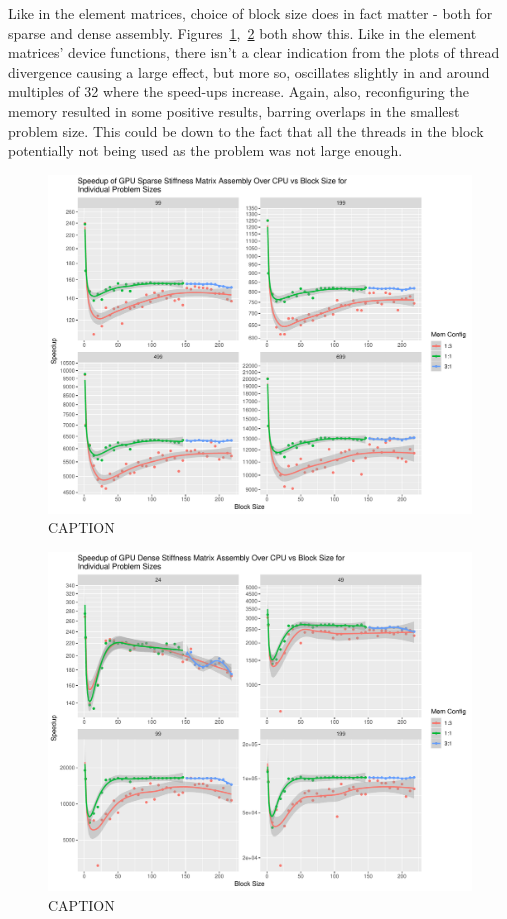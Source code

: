 Like in the element matrices, choice of block size does in fact matter - both for sparse and dense assembly. Figures~\ref{fig:assem_sparse_reconfig},~\ref{fig:assem_dense_reconfig} both show this. Like in the element matrices' device functions, there isn't a clear indication from the plots of thread divergence causing a large effect, but more so, oscillates slightly in and around multiples of 32 where the speed-ups increase. Again, also, reconfiguring the memory resulted in some positive results, barring overlaps in the smallest problem size. This could be down to the fact that all the threads in the block potentially not being used as the problem was not large enough.

\begin{figure}
	\centering
	\includegraphics[width=0.9\linewidth]{Plots/assem_dev_sparse_speedups_reconfig}
	\caption{CAPTION}
	\label{fig:assem_sparse_reconfig}
\end{figure}

\begin{figure}
	\centering
	\includegraphics[width=0.9\linewidth]{Plots/assem_dev_dense_speedups_reconfig}
	\caption{CAPTION}
	\label{fig:assem_dense_reconfig}
\end{figure}


